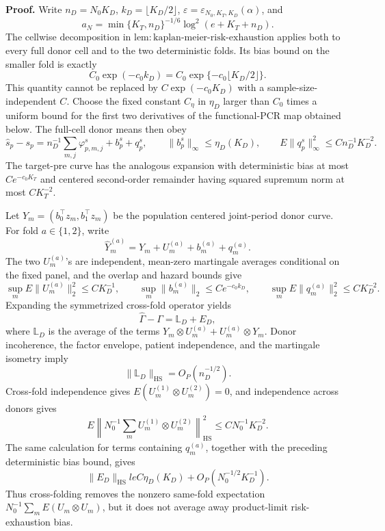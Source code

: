 \textbf{Proof.}
Write \(n_D=N_0K_D\), \(k_D=\lfloor K_D/2\rfloor\), \(\varepsilon=\varepsilon_{N_0,K_T,K_D}(\alpha)\), and
\[
 a_N=\min\{K_T,n_D\}^{-1/6}\log^2(e+K_T+n_D).
\]
The cellwise decomposition in \(\mathrm{lem:kaplan\mbox{-}meier\mbox{-}risk\mbox{-}exhaustion}\) applies both to every full donor cell and to the two deterministic folds.  Its bias bound on the smaller fold is exactly
\[
 C_0\exp(-c_0k_D)=C_0\exp\{-c_0\lfloor K_D/2\rfloor\}.
\]
This quantity cannot be replaced by \(C\exp(-c_0K_D)\) with a sample-size-independent \(C\).  Choose the fixed constant \(C_\eta\) in \(\eta_D\) larger than \(C_0\) times a uniform bound for the first two derivatives of the functional-PCR map obtained below.  The full-cell donor means then obey
\[
 \widehat s_p-s_p
 =n_D^{-1}\sum_{m,j}\varphi^s_{p,m,j}+b^s_p+q^s_p,
 \qquad
 \|b^s_p\|_\infty\le\eta_D(K_D),
 \qquad
 E\|q^s_p\|_\infty^2\le Cn_D^{-1}K_D^{-2}.
\]
The target-pre curve has the analogous expansion with deterministic bias at most \(C e^{-c_0K_T}\) and centered second-order remainder having squared supremum norm at most \(CK_T^{-2}\).

Let \(Y_m=(b_0^\top z_m,b_1^\top z_m)\) be the population centered joint-period donor curve.  For fold \(a\in\{1,2\}\), write
\[
 \widehat Y_m^{(a)}=Y_m+U_m^{(a)}+b_m^{(a)}+q_m^{(a)}.
\]
The two \(U_m^{(a)}\)'s are independent, mean-zero martingale averages conditional on the fixed panel, and the overlap and hazard bounds give
\[
 \sup_mE\|U_m^{(a)}\|_2^2\le CK_D^{-1},\qquad
 \sup_m\|b_m^{(a)}\|_2\le C e^{-c_0k_D},\qquad
 \sup_mE\|q_m^{(a)}\|_2^2\le CK_D^{-2}.
\]
Expanding the symmetrized cross-fold operator yields
\[
 \widehat\Gamma-\Gamma=\mathbb L_D+E_D,
\]
where \(\mathbb L_D\) is the average of the terms \(Y_m\otimes U_m^{(a)}+U_m^{(a)}\otimes Y_m\).  Donor incoherence, the factor envelope, patient independence, and the martingale isometry imply
\[
 \|\mathbb L_D\|_{\mathrm{HS}}=O_P(n_D^{-1/2}).
\]
Cross-fold independence gives \(E(U_m^{(1)}\otimes U_m^{(2)})=0\), and independence across donors gives
\[
 E\left\|N_0^{-1}\sum_mU_m^{(1)}\otimes U_m^{(2)}\right\|_{\mathrm{HS}}^2
 \le CN_0^{-1}K_D^{-2}.
\]
The same calculation for terms containing \(q_m^{(a)}\), together with the preceding deterministic bias bound, gives
\[
 \|E_D\|_{\mathrm{HS}}le C\eta_D(K_D)+O_P(N_0^{-1/2}K_D^{-1}).
\]
Thus cross-folding removes the nonzero same-fold expectation \(N_0^{-1}\sum_mE(U_m\otimes U_m)\), but it does not average away product-limit risk-exhaustion bias.

